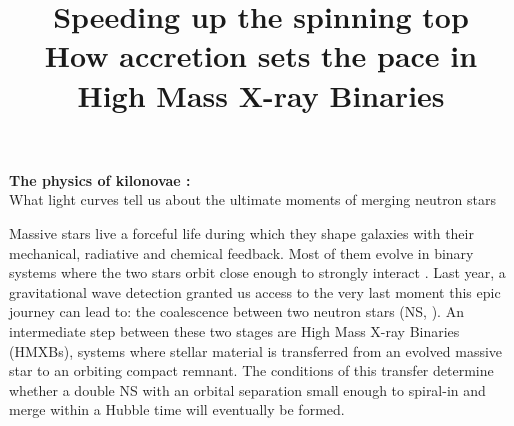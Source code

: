 \documentclass[12pt,onecolumn]{article}
\title{	
\vspace*{-2.5cm}
\Large Speeding up the spinning top\\
\large How accretion sets the pace in High Mass X-ray Binaries  \\ %
}
\author{\tiny} %
\date{\tiny }%
\makeatletter
\newcommand*{\hmxbs}{HMXBs\@\xspace}
\newcommand*{\ns}{NS\@\xspace}
\makeatother
\begin{document}


\renewcommand{\headrulewidth}{1pt}
\pagestyle{fancy}
\fancyhf{}
\rfoot{\thepage / \pageref{LastPage}}

\vspace*{-1.2cm}
\begin{center}
\Large \textbf{The physics of kilonovae :}\\
\large What light curves tell us about the ultimate moments of merging neutron stars  
\end{center}
\normalfont

Massive stars live a forceful life during which they shape galaxies with their mechanical, radiative and chemical feedback. Most of them evolve in binary systems where the two stars orbit close enough to strongly interact \cite{Sana2012}. Last year, a gravitational wave detection granted us access to the very last moment this epic journey can lead to: the coalescence between two neutron stars (\ns, \cite{TheLIGOScientificCollaboration2017}). An intermediate step between these two stages are High Mass X-ray Binaries (\hmxbs), systems where stellar material is transferred from an evolved massive star to an orbiting compact remnant. The conditions of this transfer determine whether a double \ns with an orbital separation small enough to spiral-in and merge within a Hubble time will eventually be formed. 
\end{document}
